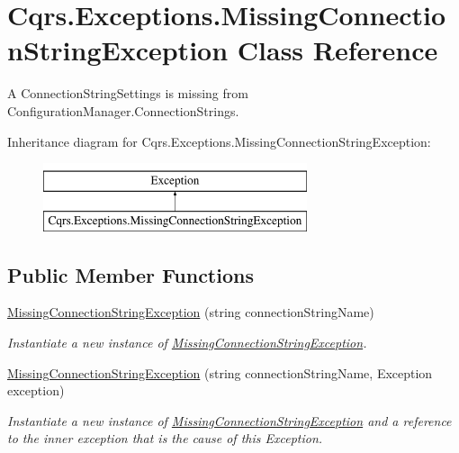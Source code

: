 \hypertarget{classCqrs_1_1Exceptions_1_1MissingConnectionStringException}{}\section{Cqrs.\+Exceptions.\+Missing\+Connection\+String\+Exception Class Reference}
\label{classCqrs_1_1Exceptions_1_1MissingConnectionStringException}


A Connection\+String\+Settings is missing from Configuration\+Manager.\+Connection\+Strings.  


Inheritance diagram for Cqrs.\+Exceptions.\+Missing\+Connection\+String\+Exception\+:\begin{figure}[H]
\begin{center}
\leavevmode
\includegraphics[height=2.000000cm]{classCqrs_1_1Exceptions_1_1MissingConnectionStringException}
\end{center}
\end{figure}
\subsection*{Public Member Functions}
\begin{DoxyCompactItemize}
\item 
\hyperlink{classCqrs_1_1Exceptions_1_1MissingConnectionStringException_a7eb344b72528cd591b290891fcedc7e5_a7eb344b72528cd591b290891fcedc7e5}{Missing\+Connection\+String\+Exception} (string connection\+String\+Name)
\begin{DoxyCompactList}\small\item\em Instantiate a new instance of \hyperlink{classCqrs_1_1Exceptions_1_1MissingConnectionStringException}{Missing\+Connection\+String\+Exception}. \end{DoxyCompactList}\item 
\hyperlink{classCqrs_1_1Exceptions_1_1MissingConnectionStringException_a0d80ef8486846848259953851974ebdc_a0d80ef8486846848259953851974ebdc}{Missing\+Connection\+String\+Exception} (string connection\+String\+Name, Exception exception)
\begin{DoxyCompactList}\small\item\em Instantiate a new instance of \hyperlink{classCqrs_1_1Exceptions_1_1MissingConnectionStringException}{Missing\+Connection\+String\+Exception} and a reference to the inner {\itshape exception}  that is the cause of this Exception. \end{DoxyCompactList}\end{DoxyCompactItemize}
